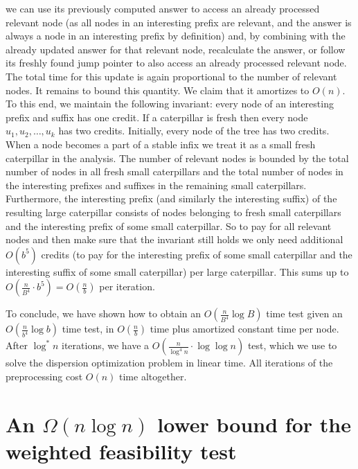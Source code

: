 \documentclass[a4paper,UKenglish]{lipics-v2016}
\theoremstyle{plain}
\begin{document}
we can use its previously computed answer to access an already processed relevant node
(as all nodes in an interesting prefix are relevant, and the answer is always a node in an
interesting prefix by definition) and, by combining with the already updated answer for that
relevant node, recalculate the answer, or follow its freshly found jump pointer to also access
an already processed relevant node. The total time for this update is again proportional to the
number of relevant nodes. It remains to bound this quantity. We claim that it
amortizes to $O(n)$. To this end, we maintain the following invariant: every node
of an interesting prefix and suffix has one credit. If a caterpillar is fresh
then every node $u_{1},u_{2},\ldots,u_{k}$ has two credits. Initially, every node of the tree
has two credits. When a node becomes a part of a stable infix we treat it as a small fresh
caterpillar in the analysis. The number of relevant nodes is bounded by the total number
of nodes in all fresh small caterpillars and the total number of nodes in the interesting
prefixes and suffixes in the remaining small caterpillars. Furthermore,
the interesting prefix (and similarly the interesting suffix) of the resulting large caterpillar
consists of nodes belonging to fresh small caterpillars and the interesting prefix of
some small caterpillar. So to pay for all relevant nodes and then make sure that the invariant
still holds we only need additional $O(b^{5})$ credits (to pay for the interesting prefix
of some small caterpillar and the interesting suffix of some small caterpillar) per large
caterpillar. This sums up to $O(\frac{n}{B^{4}}\cdot b^{5}) = O(\frac{n}{b})$ per iteration.

To conclude, we have shown how to obtain an $O(\frac{n}{B^{4}}\log B)$ time test given an $O(\frac{n}{b^{4}}\log b)$
time test, in $O(\frac{n}{b})$ time plus amortized constant time per
node. After $\log ^*n$ iterations, we have a $O(\frac{n}{\log ^4n} \cdot \log \log n)$ test,
which we use to solve the dispersion optimization problem in linear time. All iterations of the preprocessing
cost $O(n)$ time altogether.

\section{An \texorpdfstring{\boldmath$ \Omega (n\log n)$}{Omega(nlogn)} lower bound for the weighted feasibility test}\label{appendix weighted f.t. lower bound}
\end{document}

